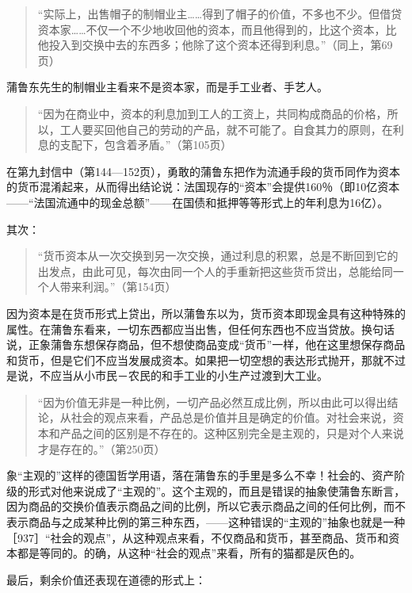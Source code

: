 \begin{quote}{“实际上，出售帽子的制帽业主……得到了帽子的价值，不多也不少。但借贷资本家……不仅一个不少地收回他的资本，而且他得到的，比这个资本，比他投入到交换中去的东西多；他除了这个资本还得到利息。”（同上，第69页）}\end{quote}

蒲鲁东先生的制帽业主看来不是资本家，而是手工业者、手艺人。

\begin{quote}{“因为在商业中，资本的利息加到工人的工资上，共同构成商品的价格，所以，工人要买回他自己的劳动的产品，就不可能了。自食其力的原则，在利息的支配下，包含着矛盾。”（第105页）}\end{quote}

在第九封信中（第144—152页），勇敢的蒲鲁东把作为流通手段的货币同作为资本的货币混淆起来，从而得出结论说：法国现存的“资本”会提供160％（即10亿资本——“法国流通中的现金总额”——在国债和抵押等等形式上的年利息为16亿）。

其次：

\begin{quote}{“货币资本从一次交换到另一次交换，通过利息的积累，总是不断回到它的出发点，由此可见，每次由同一个人的手重新把这些货币贷出，总能给同一个人带来利润。”（第154页）}\end{quote}

因为资本是在货币形式上贷出，所以蒲鲁东以为，货币资本即现金具有这种特殊的属性。在蒲鲁东看来，一切东西都应当出售，但任何东西也不应当贷放。换句话说，正象蒲鲁东想保存商品，但不想使商品变成“货币”一样，他在这里想保存商品和货币，但是它们不应当发展成资本。如果把一切空想的表达形式抛开，那就不过是说，不应当从小市民－农民的和手工业的小生产过渡到大工业。

\begin{quote}{“因为价值无非是一种比例，一切产品必然互成比例，所以由此可以得出结论，从社会的观点来看，产品总是价值并且是确定的价值。对社会来说，资本和产品之间的区别是不存在的。这种区别完全是主观的，只是对个人来说才是存在的。”（第250页）}\end{quote}

象“主观的”这样的德国哲学用语，落在蒲鲁东的手里是多么不幸！社会的、资产阶级的形式对他来说成了“主观的”。这个主观的，而且是错误的抽象使蒲鲁东断言，因为商品的交换价值表示商品之间的比例，所以它表示商品之间的任何比例，而不表示商品与之成某种比例的第三种东西，——这种错误的“主观的”抽象也就是一种［937］“社会的观点”，从这种观点来看，不仅商品和货币，甚至商品、货币和资本都是等同的。的确，从这种“社会的观点”来看，所有的猫都是灰色的。

最后，剩余价值还表现在道德的形式上：

